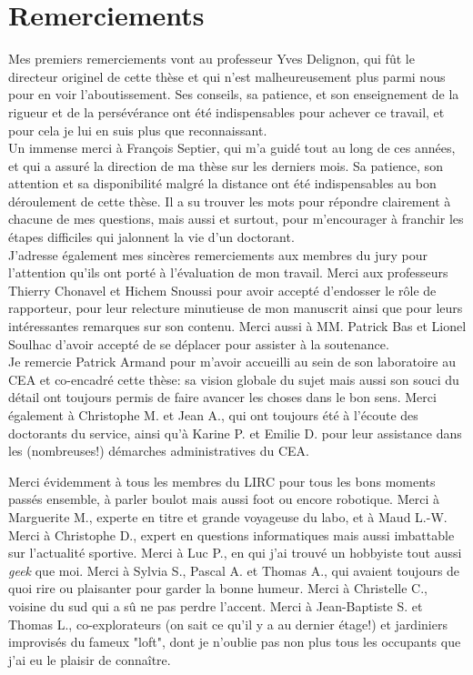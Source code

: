 \clearpage
\pagestyle{plain}


\section*{Remerciements}
{\small 
Mes premiers remerciements vont au professeur Yves Delignon, qui fût le directeur originel de cette thèse et qui n'est malheureusement plus parmi nous pour en voir l'aboutissement. Ses conseils, sa patience, et son enseignement de la rigueur et de la persévérance ont été indispensables pour achever ce travail, et pour cela je lui en suis plus que reconnaissant. \\

Un immense merci à François Septier, qui m'a guidé tout au long de ces années, et qui a assuré la direction de ma thèse sur les derniers mois. Sa patience, son attention et sa disponibilité malgré la distance ont été indispensables au bon déroulement de cette thèse. Il a su trouver les mots pour répondre clairement à chacune de mes questions, mais aussi et surtout, pour m'encourager à franchir les étapes difficiles qui jalonnent la vie d'un doctorant. \\

J'adresse également mes sincères remerciements aux membres du jury pour l'attention qu'ils ont porté à l'évaluation de mon travail. Merci aux professeurs Thierry Chonavel et Hichem Snoussi pour avoir accepté d'endosser le rôle de rapporteur, pour leur relecture minutieuse de mon manuscrit ainsi que pour leurs intéressantes remarques sur son contenu. Merci aussi à MM. Patrick Bas et Lionel Soulhac d'avoir accepté de se déplacer pour assister à la soutenance. \\

Je remercie Patrick Armand pour m'avoir accueilli au sein de son laboratoire au CEA et co-encadré cette thèse: sa vision globale du sujet mais aussi son souci du détail ont toujours permis de faire avancer les choses dans le bon sens. Merci également à Christophe M.  et Jean A., qui ont toujours été à l'écoute des doctorants du service, ainsi qu'à Karine P. et Emilie D. pour leur assistance dans les (nombreuses!) démarches administratives du CEA.

 Merci évidemment à tous les membres du LIRC pour tous les bons moments passés ensemble, à parler boulot mais aussi foot ou encore robotique. Merci à Marguerite M., experte en titre et grande voyageuse du labo, et à Maud L.-W. Merci à Christophe D., expert en questions informatiques mais aussi imbattable sur l'actualité sportive. Merci à Luc P., en qui j'ai trouvé un hobbyiste tout aussi \textit{geek} que moi. Merci à Sylvia S., Pascal A. et Thomas A., qui avaient toujours de quoi rire ou plaisanter pour garder la bonne humeur. Merci à Christelle C., voisine du sud qui a sû ne pas perdre l'accent. Merci à Jean-Baptiste S. et Thomas L., co-explorateurs (on sait ce qu'il y a au dernier étage!) et jardiniers improvisés du fameux "loft", dont je n'oublie pas non plus tous les occupants que j'ai eu le plaisir de connaître.
 

}

